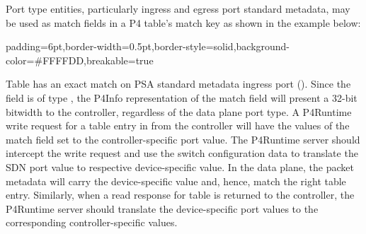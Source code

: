 \documentclass[11pt]{article}
\begin{document}
{%
\noindent{}Port type entities, particularly ingress and egress port standard metadata, may
be used as match fields in a P4 table's match key as shown in the example below:%

\begin{mdbmargintb}{6pt}{6pt}%
\begin{mdblock}{padding=6pt,border-width=0.5pt,border-style=solid,background-color=\#FFFFDD,breakable=true}%
\begin{mdpre}%
\end{mdpre}%
\end{mdblock}%
\end{mdbmargintb}%

\noindent{}Table  has an exact match on PSA standard metadata ingress port
(). Since the field is of type , the P4Info
representation of the match field will present a 32-bit bitwidth to the
controller, regardless of the data plane port type. A P4Runtime write request
for a table entry in  from the controller will have the values of the match
field set to the controller-specific port value. The P4Runtime server should
intercept the write request and use the switch configuration data to translate
the SDN port value to respective device-specific value. In the data plane, the
packet metadata will carry the device-specific value and, hence, match the right
table entry. Similarly, when a read response for table  is returned to the
controller, the P4Runtime server should translate the device-specific port
values to the corresponding controller-specific values.%

}
\end{document}
